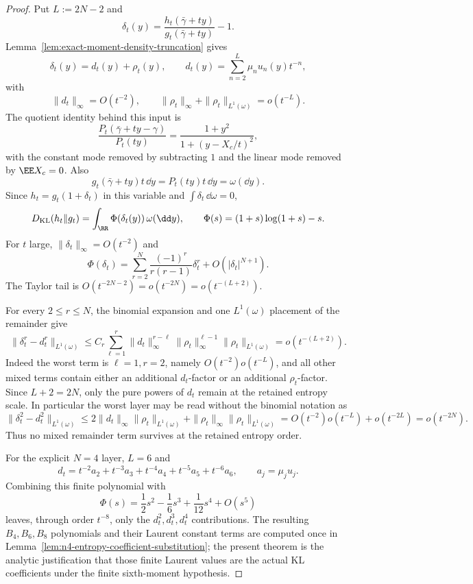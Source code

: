 \begin{proof}
Put \(L:=2N-2\) and
\[
\delta_t(y)=\frac{h_t(\bar{\gamma}+ty)}{g_t(\bar{\gamma}+ty)}-1 .
\]
Lemma~\ref{lem:exact-moment-density-truncation} gives
\begin{equation}\label{eq:coefficient-identification-transfer-density-input}
\delta_t(y)=d_t(y)+\rho_t(y),\qquad
d_t(y)=\sum_{n=2}^{L}\mu_nu_n(y)t^{-n},
\end{equation}
with
\begin{equation}\label{eq:coefficient-identification-transfer-density-remainder}
\|d_t\|_\infty=O(t^{-2}),\qquad
\|\rho_t\|_\infty+\|\rho_t\|_{L^1(\omega)}=o(t^{-L}).
\end{equation}
The quotient identity behind this input is
\[
\frac{P_t(\bar{\gamma}+ty-\gamma)}{P_t(ty)}
=\frac{1+y^2}{1+(y-X_c/t)^2},
\]
with the constant mode removed by subtracting \(1\) and the linear mode
removed by \(\EE X_c=0\).  Also
\[
g_t(\bar{\gamma}+ty)t\,\dd y=P_t(ty)t\,\dd y=\omega(\dd y).
\]
Since \(h_t=g_t(1+\delta_t)\) in this variable and
\(\int\delta_t\,\dd\omega=0\),
\begin{equation}\label{eq:coefficient-identification-transfer-kl}
D_{\mathrm{KL}}(h_t\|g_t)
=\int_{\RR}\Phi(\delta_t(y))\,\omega(\dd y),
\qquad
\Phi(s)=(1+s)\log(1+s)-s .
\end{equation}
For \(t\) large, \(\|\delta_t\|_\infty=O(t^{-2})\) and
\[
\Phi(\delta_t)=
\sum_{r=2}^{N}\frac{(-1)^r}{r(r-1)}\delta_t^r
+O(|\delta_t|^{N+1}).
\]
The Taylor tail is \(O(t^{-2N-2})=o(t^{-2N})=o(t^{-(L+2)})\).

For every \(2\le r\le N\), the binomial expansion and one
\(L^1(\omega)\) placement of the remainder give
\[
\|\delta_t^r-d_t^r\|_{L^1(\omega)}
\le
C_r\sum_{\ell=1}^{r}
\|d_t\|_\infty^{r-\ell}
\|\rho_t\|_\infty^{\ell-1}
\|\rho_t\|_{L^1(\omega)}
=o(t^{-(L+2)}).
\]
Indeed the worst term is \(\ell=1,r=2\), namely
\(O(t^{-2})o(t^{-L})\), and all other mixed terms contain either an additional
\(d_t\)-factor or an additional \(\rho_t\)-factor.  Since \(L+2=2N\), only the
pure powers of \(d_t\) remain at the retained entropy scale.
In particular the worst layer may be read without the binomial notation as
\[
\|\delta_t^2-d_t^2\|_{L^1(\omega)}
\le
2\|d_t\|_\infty\|\rho_t\|_{L^1(\omega)}
+\|\rho_t\|_\infty\|\rho_t\|_{L^1(\omega)}
=O(t^{-2})o(t^{-L})+o(t^{-2L})
=o(t^{-2N}).
\]
Thus no mixed remainder term survives at the retained entropy order.

For the explicit \(N=4\) layer, \(L=6\) and
\[
d_t=t^{-2}a_2+t^{-3}a_3+t^{-4}a_4+t^{-5}a_5+t^{-6}a_6,
\qquad
a_j=\mu_j u_j .
\]
Combining this finite polynomial with
\[
\Phi(s)=\frac12s^2-\frac16s^3+\frac1{12}s^4+O(s^5)
\]
leaves, through order \(t^{-8}\), only the \(d_t^2,d_t^3,d_t^4\)
contributions.  The resulting \(B_4,B_6,B_8\) polynomials and their Laurent
constant terms are computed once in
Lemma~\ref{lem:n4-entropy-coefficient-substitution}; the present theorem is
the analytic justification that those finite Laurent values are the actual
KL coefficients under the finite sixth-moment hypothesis.


\end{proof}
